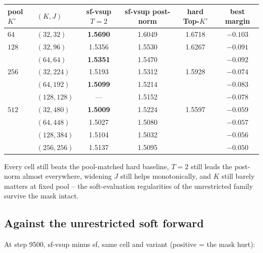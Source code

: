 \documentclass[11pt,a4paper]{article}
\newcommand{\bst}[1]{\textbf{#1}}
\newcommand{\Kp}{K'}
\begin{document}
\begin{center}\small
\begin{tabular}{llcccc}
\toprule
pool $\Kp$ & $(K,J)$ & sf-vsup $T{=}2$ & sf-vsup post-norm & hard Top-$\Kp$ & best margin \\
\midrule
$64$  & $(32,32)$   & \bst{1.5690} & 1.6049 & 1.6718 & $-0.103$ \\
\midrule
$128$ & $(32,96)$   & 1.5356 & 1.5530 & 1.6267 & $-0.091$ \\
      & $(64,64)$   & \bst{1.5351} & 1.5470 & & $-0.092$ \\
\midrule
$256$ & $(32,224)$  & 1.5193 & 1.5312 & 1.5928 & $-0.074$ \\
      & $(64,192)$  & \bst{1.5099} & 1.5214 & & $-0.083$ \\
      & $(128,128)$ & --- & 1.5152 & & $-0.078$ \\
\midrule
$512$ & $(32,480)$  & \bst{1.5009} & 1.5224 & 1.5597 & $-0.059$ \\
      & $(64,448)$  & 1.5027 & 1.5080 & & $-0.057$ \\
      & $(128,384)$ & 1.5104 & 1.5032 & & $-0.056$ \\
      & $(256,256)$ & 1.5137 & 1.5095 & & $-0.050$ \\
\bottomrule
\end{tabular}
\end{center}

Every cell still beats the pool-matched hard baseline, $T=2$ still leads the
post-norm almost everywhere, widening $J$ still helps monotonically, and $K$
still barely matters at fixed pool -- the soft-evaluation regularities of the
unrestricted family survive the mask intact.

\subsection*{Against the unrestricted soft forward}

At step 9500, sf-vsup minus sf, same cell and variant (positive = the mask
hurt):
\end{document}
